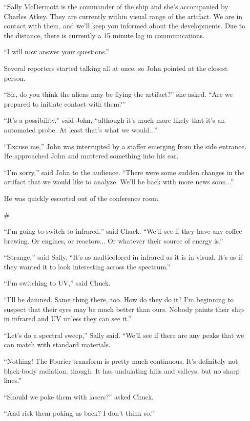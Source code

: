 \documentclass[12pt]{book}
\newcommand{\sbreak}{
\begin{center}
  \#
\end{center}
}
\begin{document}
``Sally McDermott is the commander of the ship and she's accompanied by Charles Atkey. They are currently within visual range of the artifact. We are in contact with them, and we'll keep you informed about the developments. Due to the distance, there is currently a 15 minute lag in communications.

``I will now answer your questions.''

Several reporters started talking all at once, so John pointed at the closest person.

``Sir, do you think the aliens may be flying the artifact?'' she asked. ``Are we prepared to initiate contact with them?''

``It's a possibility,'' said John, ``although it's much more likely that it's an automated probe. At least that's what we would...''

``Excuse me,'' John was interrupted by a staffer emerging from the side entrance. He approached John and muttered something into his ear.

``I'm sorry,'' said John to the audience. ``There were some sudden changes in the artifact that we would like to analyze. We'll be back with more news soon...''

He was quickly escorted out of the conference room.

\sbreak

``I'm going to switch to infrared,'' said Chuck. ``We'll see if they have any coffee brewing. Or engines, or reactors... Or whatever their source of energy is.''

``Strange,'' said Sally. ``It's as multicolored in infrared as it is in visual. It's as if they wanted it to look interesting across the spectrum.''

``I'm switching to UV,'' said Chuck. 

``I'll be damned. Same thing there, too. How do they do it? I'm beginning to suspect that their eyes may be much better than ours. Nobody paints their ship in infrared and UV unless they can see it.''

``Let's do a spectral sweep,'' Sally said. ``We'll see if there are any peaks that we can match with standard materials.

``Nothing! The Fourier transform is pretty much continuous. It's definitely not black-body radiation, though. It has undulating hills and valleys, but no sharp lines.''

``Should we poke them with lasers?'' asked Chuck.

``And risk them poking us back? I don't think so.''
\end{document}
